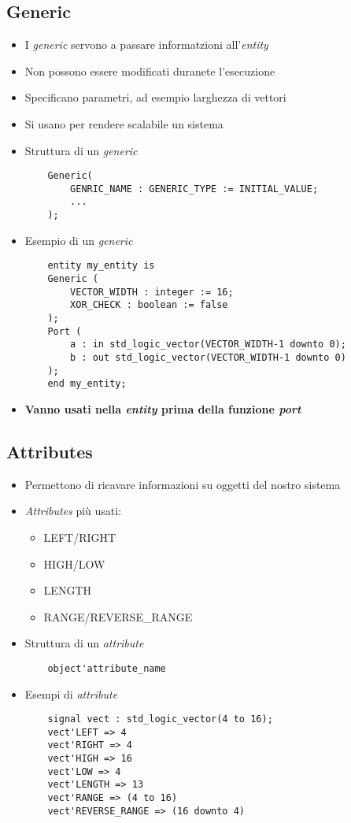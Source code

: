 \documentclass{article}
\begin{document}
\subsection{Generic}
\begin{itemize}
	\item I \textit{generic} servono a passare informatzioni all'\textit{entity}
	\item Non possono essere modificati duranete l'esecuzione
	\item Specificano parametri, ad esempio larghezza di vettori
	\item Si usano per rendere scalabile un sistema
	\item Struttura di un \textit{generic}
	      \begin{verbatim}
    Generic(
        GENRIC_NAME : GENERIC_TYPE := INITIAL_VALUE;
        ...
    );
	      \end{verbatim}
	\item Esempio di un \textit{generic}
	      \begin{verbatim}
    entity my_entity is
    Generic (
        VECTOR_WIDTH : integer := 16;
        XOR_CHECK : boolean := false
    );
    Port (
        a : in std_logic_vector(VECTOR_WIDTH-1 downto 0);
        b : out std_logic_vector(VECTOR_WIDTH-1 downto 0)
    );
    end my_entity;
	      \end{verbatim}
	\item \textbf{Vanno usati nella \textit{entity} prima della funzione \textit{port}}
\end{itemize}

\subsection{Attributes}
\begin{itemize}
	\item Permettono di ricavare informazioni su oggetti del nostro sistema
	\item \textit{Attributes} più usati:
	      \begin{itemize}
	      	\item LEFT/RIGHT
	      	\item HIGH/LOW
	      	\item LENGTH
	      	\item RANGE/REVERSE\_RANGE
	      \end{itemize}
	\item Struttura di un \textit{attribute}
	      \begin{verbatim}
    object'attribute_name
	      \end{verbatim}
	\bigskip
	\item Esempi di \textit{attribute}
	      \begin{verbatim}
    signal vect : std_logic_vector(4 to 16);
    vect'LEFT => 4
    vect'RIGHT => 4
    vect'HIGH => 16
    vect'LOW => 4
    vect'LENGTH => 13
    vect'RANGE => (4 to 16)
    vect'REVERSE_RANGE => (16 downto 4)
	      \end{verbatim}
\end{itemize}
\end{document}
